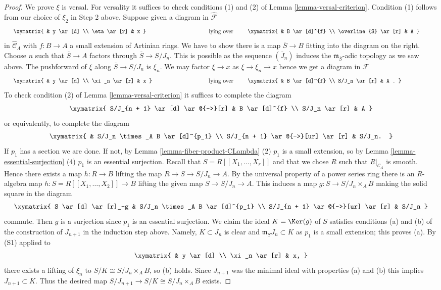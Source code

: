 \begin{proof}
\medskip\noindent
We prove $\xi$ is versal. For versality it suffices to check
conditions (1) and (2) of
Lemma \ref{lemma-versal-criterion}.
Condition (1) follows from our choice of $\xi_2$ in Step 2 above.
Suppose given a diagram in $\widehat{\mathcal{F}}$
$$
\vcenter{
\xymatrix{
            &  y \ar[d] \\
\eta \ar[r]  &  x
}
}
\quad\text{lying over}\quad
\vcenter{
\xymatrix{
         &   B  \ar[d]^{f} \\
\overline{S} \ar[r] &   A
}
}
$$
in $\widehat{\mathcal{C}}_\Lambda$ with $f: B \to A$ a small extension
of Artinian rings. We have to show there is a map $\overline{S} \to B$ fitting
into the diagram on the right. Choose $n$ such that
$\overline{S} \to A$ factors through $\overline{S} \to S/J_n$. This is
possible as the sequence $(\overline{J}_n)$ induces the
$\mathfrak m_{\overline{S}}$-adic topology as we saw above.
The pushforward of $\xi$ along $\overline{S} \to S/J_n$ is $\xi_n$.
We may factor $\xi \to x$ as $\xi \to \xi_n \to x$ hence we get a diagram
in $\mathcal{F}$
$$
\vcenter{
\xymatrix{
            &  y \ar[d] \\
\xi_n \ar[r]  &  x
}
}
\quad\text{lying over}\quad
\vcenter{
\xymatrix{
         &   B  \ar[d]^{f} \\
S/J_n \ar[r] &   A .
}
}
$$
To check condition (2) of
Lemma \ref{lemma-versal-criterion}
it suffices to complete the diagram
$$
\xymatrix{
S/J_{n + 1} \ar[d] \ar@{-->}[r] & B \ar[d]^{f} \\
S/J_n   \ar[r] & A
}
$$
or equivalently, to complete the diagram
$$
\xymatrix{
  &  S/J_n \times_A B \ar[d]^{p_1} \\
S/J_{n + 1} \ar@{-->}[ur] \ar[r] &  S/J_n.
}
$$
If $p_1$ has a section we are done. If not, by
Lemma \ref{lemma-fiber-product-CLambda} (2)
$p_1$ is a small extension, so by
Lemma \ref{lemma-essential-surjection} (4)
$p_1$ is an essential surjection. Recall that $S = R[[X_1, \ldots, X_r]]$
and that we chose $R$ such that $\underline{R}|_{\mathcal{C}_\Lambda}$
is smooth. Hence there exists a map $h : R \to B$ lifting the map
$R \to S \to S/J_n \to A$. By the universal property of a power series
ring there is an $R$-algebra map $h : S = R[[X_1, \dots, X_2]] \to B$
lifting the given map $S \to S/J_n \to A$. This induces a map
$g: S \to S/J_n \times_A B$ making the solid square in the diagram
$$
\xymatrix{
S \ar[d] \ar[r]_-g  &  S/J_n \times_A B \ar[d]^{p_1} \\
S/J_{n + 1} \ar@{-->}[ur] \ar[r] &  S/J_n
}
$$
commute. Then $g$ is a surjection since $p_1$ is an essential surjection.
We claim the ideal $K = \Ker(g)$ of $S$ satisfies conditions (a) and
(b) of the construction of $J_{n + 1}$ in the induction step above.
Namely, $K \subset J_n$ is clear and $\mathfrak m_SJ_n \subset K$ as $p_1$
is a small extension; this proves (a). By (S1) applied to
$$
\xymatrix{
            &  y \ar[d] \\
\xi_n \ar[r]  &  x,
}
$$
there exists a lifting of $\xi_n$ to $S/K \cong S/J_n \times_A B$, so (b)
holds. Since $J_{n + 1}$ was the minimal ideal with properties (a) and (b)
this implies $J_{n + 1} \subset K$. Thus the desired map
$S/J_{n+1} \to S/K \cong S/J_n \times_A B$ exists.
\end{proof}
